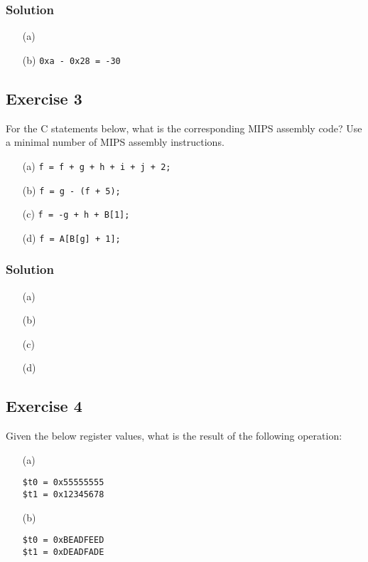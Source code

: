 \documentclass[12pt]{article}
\begin{document}
\subsubsection*{Solution}
\begin{itemize}
\item[(a)] 
\item[(b)] {\tt 0xa - 0x28 = -30}
\end{itemize}

\subsection*{Exercise 3}
For the C statements below, what is the corresponding MIPS assembly code? Use a minimal number of MIPS assembly instructions.
\begin{itemize}
\item[(a)] {\tt f = f + g + h + i + j + 2;}
\item[(b)] {\tt f = g - (f + 5);}
\item[(c)] {\tt f = -g + h + B[1];}
\item[(d)] {\tt f = A[B[g] + 1];}
\end{itemize}
\subsubsection*{Solution}
\begin{itemize}
\item[(a)] 

\item[(b)] 

\item[(c)] 

\item[(d)] 
\end{itemize}

\subsection*{Exercise 4}
Given the below register values, what is the result of the following operation:

\begin{itemize}
\item[(a)] \begin{verbatim}
$t0 = 0x55555555
$t1 = 0x12345678
\end{verbatim}
\item[(b)] \begin{verbatim}
$t0 = 0xBEADFEED
$t1 = 0xDEADFADE
\end{verbatim}
\end{itemize}
\end{document}
